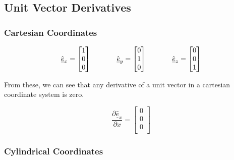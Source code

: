 \subsection{Unit Vector Derivatives}

\subsubsection{Cartesian Coordinates}

\begin{equation*}
  \hat{\underline{e}}_{x}=
  \begin{bmatrix}
    1 \\
    0 \\
    0 \\
  \end{bmatrix}
  \hspace{0.5in}
  \hat{\underline{e}}_{y}=
  \begin{bmatrix}
    0 \\
    1 \\
    0 \\
  \end{bmatrix}
  \hspace{0.5in}
  \hat{\underline{e}}_{z}=
  \begin{bmatrix}
    0 \\
    0 \\
    1 \\
  \end{bmatrix}
\end{equation*}

From these, we can see that any derivative of a unit vector in a cartesian coordinate system is zero.

\begin{equation*}
  \frac{\partial\hat{\underline{e}}_{x}}{\partial{}x}=
  \begin{bmatrix}
    0 \\
    0 \\
    0 \\
  \end{bmatrix}
\end{equation*}

\subsubsection{Cylindrical Coordinates}

